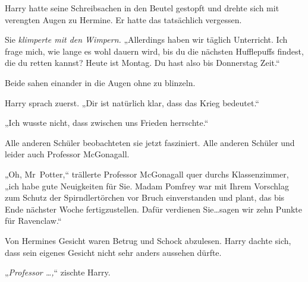 Harry hatte seine Schreibsachen in den Beutel gestopft und drehte sich mit verengten Augen zu Hermine. Er hatte das tatsächlich vergessen.

Sie \emph{klimperte mit den Wimpern.} „Allerdings haben wir täglich Unterricht. Ich frage mich, wie lange es wohl dauern wird, bis du die nächsten Hufflepuffs findest, die du retten kannst? Heute ist Montag. Du hast also bis Donnerstag Zeit.“

Beide sahen einander in die Augen ohne zu blinzeln.

Harry sprach zuerst. „Dir ist natürlich klar, dass das Krieg bedeutet.“

„Ich wusste nicht, dass zwischen uns Frieden herrschte.“

Alle anderen Schüler beobachteten sie jetzt fasziniert. Alle anderen Schüler und leider auch Professor McGonagall.

„Oh, Mr~Potter,“ trällerte Professor McGonagall quer durchs Klassenzimmer, „ich habe gute Neuigkeiten für Sie. Madam Pomfrey war mit Ihrem Vorschlag zum Schutz der Spirndlertörchen vor Bruch einverstanden und plant, das bis Ende nächster Woche fertigzustellen. Dafür verdienen Sie…sagen wir zehn Punkte für Ravenclaw.“

Von Hermines Gesicht waren Betrug und Schock abzulesen. Harry dachte sich, dass sein eigenes Gesicht nicht sehr anders aussehen dürfte.

„\emph{Professor …,}“ zischte Harry.

